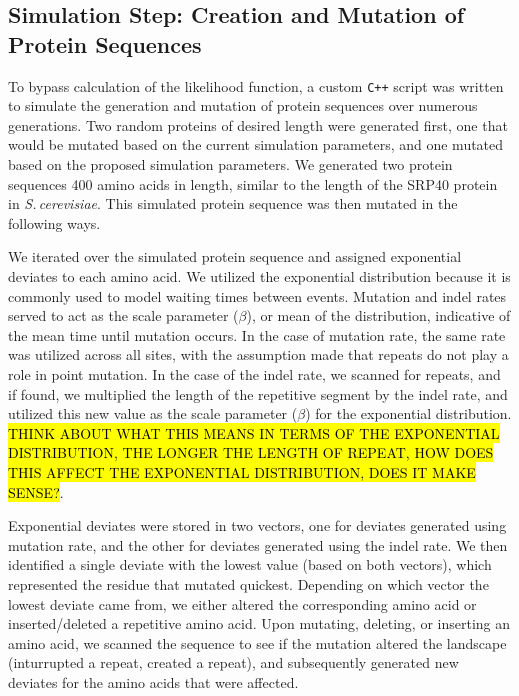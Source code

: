 \documentclass{article}
\newcommand{\scshrt}{\mbox{\textit{S.\,cerevisiae}}\xspace}
\begin{document}
\subsection{Simulation Step: Creation and Mutation of Protein Sequences}

To bypass calculation of the likelihood function, a custom \texttt{C++} script was written to simulate the generation and mutation of protein sequences over numerous generations. Two random proteins of desired length were generated first, one that would be mutated based on the current simulation parameters, and one mutated based on the proposed simulation parameters. We generated two protein sequences 400 amino acids in length, similar to the length of the SRP40 protein in \scshrt. This simulated protein sequence was then  mutated in the following ways.

We iterated over the simulated protein sequence and assigned exponential deviates to each amino acid. We utilized the exponential distribution because it is commonly used to model waiting times between events. Mutation and indel rates served to act as the scale parameter ($\beta$), or mean of the distribution, indicative of the mean time until mutation occurs. In the case of mutation rate, the same rate was utilized across all sites, with the assumption made that repeats do not play a role in point mutation. In the case of the indel rate, we scanned for repeats, and if found, we multiplied the length of the repetitive segment by the indel rate, and utilized this new value as the scale parameter ($\beta$) for the exponential distribution. \hl{THINK ABOUT WHAT THIS MEANS IN TERMS OF THE EXPONENTIAL DISTRIBUTION, THE LONGER THE LENGTH OF REPEAT, HOW DOES THIS AFFECT THE EXPONENTIAL DISTRIBUTION, DOES IT MAKE SENSE?}.

Exponential deviates were stored in two vectors, one for deviates generated using mutation rate, and the other for deviates generated using the indel rate. We then identified a single deviate with the lowest value (based on both vectors), which represented the residue that mutated quickest. Depending on which vector the lowest deviate came from, we either altered the corresponding amino acid or inserted/deleted a repetitive amino acid. Upon mutating, deleting, or inserting an amino acid, we scanned the sequence to see if the mutation altered the landscape (inturrupted a repeat, created a repeat), and subsequently generated new deviates for the amino acids that were affected.
\end{document}
